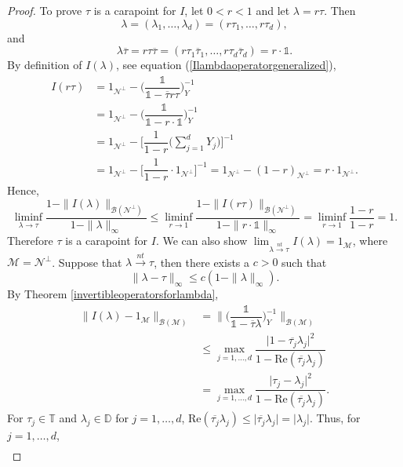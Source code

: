 \documentclass[11pt, reqno]{amsart}
\newcommand\1{\boldsymbol {1}}
\numberwithin{equation}{section}
\begin{document}
\begin{proof}
To prove $\tau$ is a carapoint for $I$, let $0<r<1$ and let $\lambda=r\tau$. Then
$$\lambda = (\lambda_{1},\hdots, \lambda_{d})=(r\tau_{1},\hdots,r\tau_{d}),$$
and 
$$\lambda\overline{\tau}=r\tau\overline{\tau}=(r\tau_{1}\overline{\tau}_{1},\hdots,r\tau_{d}\overline{\tau}_{d})=r\cdot\mathds{1}. $$
By definition of $I(\lambda)$, see equation (\ref{Ilambdaoperatorgeneralized}),
\begin{align*}
I(r\tau)&=1_{\mathcal{N^{\perp}}}-\bigg(\dfrac{\mathds{1}}{\mathds{1}-\overline{\tau}r\tau}\bigg)^{-1}_{Y}\\
        &=1_{\mathcal{N^{\perp}}}-\bigg(\dfrac{\mathds{1}}{\mathds{1}-r\cdot\mathds{1}}\bigg)^{-1}_{Y}\\
        &=1_{\mathcal{N^{\perp}}}-\Bigg[\dfrac{1}{1-r}\bigg(\sum_{j=1}^{d}Y_{j}\bigg)\Bigg]^{-1}\\
        &=1_{\mathcal{N^{\perp}}}-\Bigg[\dfrac{1}{1-r}\cdot 1_{\mathcal{N^{\perp}}}\Bigg]^{-1}=1_{\mathcal{N^{\perp}}}-(1-r)_{\mathcal{N^{\perp}}}=r\cdot 1_{\mathcal{N^{\perp}}}.
\end{align*}
Hence, 
$$\liminf_{\lambda\rightarrow \tau}\dfrac{1-\|I(\lambda)\|_{\mathcal{B(N^{\perp})}}}{1-\|\lambda\|_{\infty}}\leq \liminf_{r \rightarrow 1}\dfrac{1-\|I(r\tau)\|_{\mathcal{B(N^{\perp})}}}{1-\|r\cdot \mathds{1}\|_{\infty}}=\liminf_{r \rightarrow 1}\dfrac{1-r}{1-r}=1.$$
Therefore $\tau$ is a carapoint for $I$. We can also show $\lim_{\lambda{\overset{nt}\rightarrow}\tau}I(\lambda)=1_{\mathcal{M}}$, where $\mathcal{M}=\mathcal{N^{\perp}}$. Suppose that $\lambda{\overset{nt}\rightarrow}\tau$, then there exists a $c>0$ such that 
$$\|\lambda-\tau\|_{\infty}\leq c(1-\|\lambda\|_{\infty}).$$
By Theorem \ref{invertibleoperatorsforlambda}, 
\begin{align*}
    \|I(\lambda)-1_{\mathcal{M}}\|_{\mathcal{B(M)}} &= \bigg\|\bigg(\dfrac{\mathds{1}}{\mathds{1}-\overline{\tau}\lambda}\bigg)^{-1}_{Y}\bigg\|_{\mathcal{B(M)}}\\
    &\leq \max_{j=1,\hdots,d}\dfrac{\lvert 1-\overline{\tau_{j}}\lambda_{j}\rvert^{2}}{1-\mathrm{Re}(\overline{\tau_{j}}\lambda_{j})}\\
    &= \max_{j=1,\hdots,d}\dfrac{\lvert \tau_{j}-\lambda_{j}\rvert^{2}}{1-\mathrm{Re}(\overline{\tau_{j}}\lambda_{j})}.
\end{align*}
For $\tau_{j}\in\mathbb{T}$ and $\lambda_{j}\in\mathbb{D}$ for $j=1,\hdots,d$, 
$\mathrm{Re}(\overline{\tau_{j}}\lambda_{j}) \leq \lvert \overline{\tau_{j}}\lambda_{j}\rvert = \lvert \lambda_{j}\rvert.$
Thus,  for $j=1,\hdots,d$,
\begin{align*}

\end{align*}
\end{proof}
\end{document}
